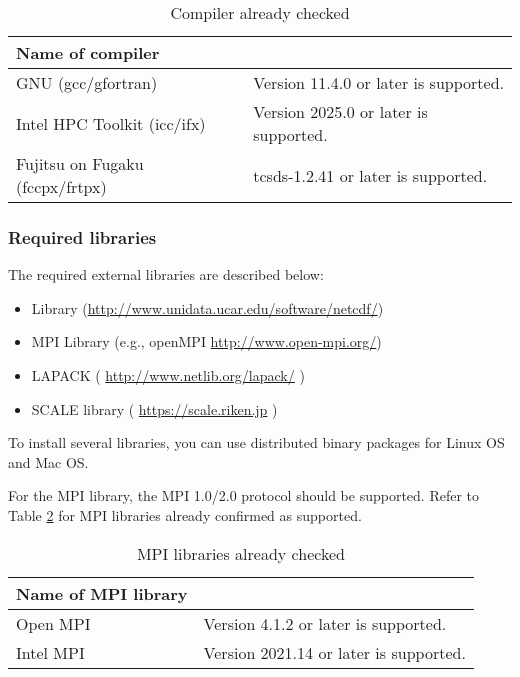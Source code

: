 \begin{table}[tb]
\begin{center}
\caption{Compiler already checked}
\begin{tabularx}{150mm}{|l|X|} \hline
 \rowcolor[gray]{0.9} Name of compiler &  \\ \hline
  GNU (gcc/gfortran)    & Version 11.4.0 or later is supported. \\ \hline
  Intel HPC Toolkit (icc/ifx)     & Version 2025.0 or later is supported. \\ \hline
  Fujitsu on Fugaku (fccpx/frtpx) & tcsds-1.2.41 or later is supported. \\ \hline
\end{tabularx}
\label{tab:compatible_compiler}
\end{center}
\end{table}



\subsubsection{Required libraries}\label{sec:inst_env}

The required external libraries are described below:
\begin{itemize}
\item {\netcdf} Library (\url{http://www.unidata.ucar.edu/software/netcdf/})
\item MPI Library (e.g., openMPI \url{http://www.open-mpi.org/})
\item LAPACK ( \url{http://www.netlib.org/lapack/} )
\item SCALE library ( \url{https://scale.riken.jp} )
\end{itemize}

To install several libraries, 
you can use distributed binary packages for Linux OS and Mac OS.

For the MPI library, the MPI 1.0/2.0 protocol should be supported.  
Refer to Table \ref{tab:compatible_mpi} for MPI libraries already confirmed as supported.

\begin{table}[tb]
\begin{center}
\caption{MPI libraries already checked}
\begin{tabularx}{150mm}{|l|X|} \hline
 \rowcolor[gray]{0.9} Name of MPI library &  \\ \hline
  Open MPI               & Version 4.1.2 or later is supported. \\ \hline
  Intel MPI             & Version 2021.14 or later is supported.\\ \hline
\end{tabularx}
\label{tab:compatible_mpi}
\end{center}
\end{table}


